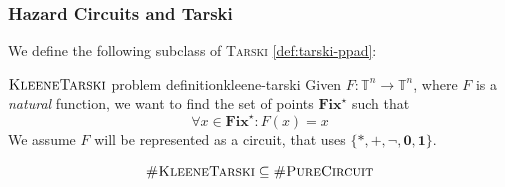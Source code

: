 %
%
%
%
%

\subsubsection{Hazard Circuits and Tarski}
We define the following subclass of \textsc{Tarski} \ref{def:tarski-ppad}:


\begin{definitionbox}{$\textnormal{\textsc{KleeneTarski}}$ problem definition}{kleene-tarski}
    Given $F: \mathbb{T}^n \to \mathbb{T}^n$, where $F$ is a \textit{natural} function,
    we want to find the set of points $\textbf{Fix}^\star$ such that
    $$
        \forall x \in \textbf{Fix}^\star: F(x)  = x
    $$
    We assume $F$ will be represented as a circuit, that uses
    $\{*, +, \neg, \mathbf{0}, \mathbf{1}\}$.
\end{definitionbox}


\begin{proposition}
    $$
    \textnormal{\textsc{\#KleeneTarski}} \subseteq \textnormal{\textsc{\#PureCircuit}}
    $$
\end{proposition}

